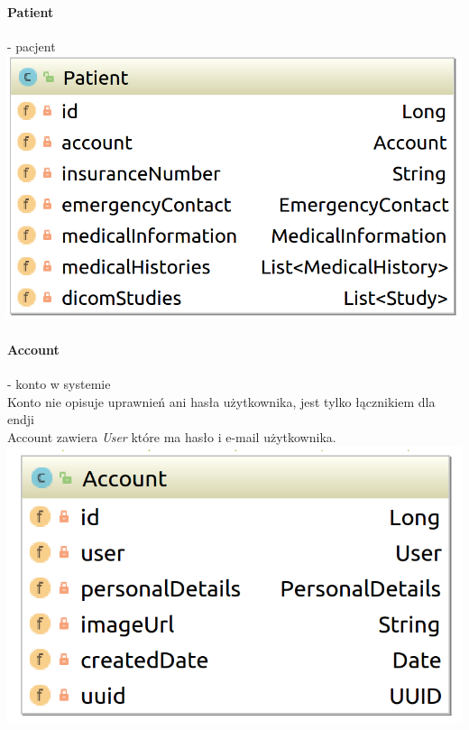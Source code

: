 \documentclass[polish,12pt]{aghthesis}
\begin{document}
    \paragraph{Patient} - pacjent \\
    \includegraphics[width=\textwidth]{Patient}
    \paragraph{Account} - konto w systemie \\
    Konto nie opisuje uprawnień ani hasła użytkownika, jest tylko łącznikiem dla endji \\
    Account zawiera \emph{User} które ma hasło i e-mail użytkownika.
    \includegraphics[width=\textwidth]{Account}
\end{document}
